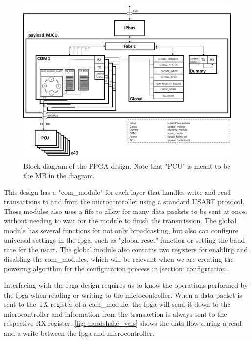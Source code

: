 \documentclass[main.tex]{subfiles}
\begin{document}
\begin{figure}[!htpb]
    \centering
    \includegraphics[width=13cm, scale=1]{images/BlockDiagramFPGA.png}
    \caption{Block diagram of the FPGA design. Note that "PCU" is meant to be the MB in the diagram.}
    \label{fig: fpga_block}
\end{figure}
\FloatBarrier

This design has a "com\_module" for each layer that handles write and read transactions to and from the microcontroller using a standard USART protocol. These modules also uses a \gls{fifo} to allow for many data packets to be sent at once, without needing to wait for the module to finish the transmission. The global module has several functions for not only broadcasting, but also can configure universal settings in the \gls{fpga}, such as "global reset" function or setting the baud rate for the \gls{usart}. The global module also contains two registers for enabling and disabling the com\_modules, which will be relevant when we are creating the powering algorithm for the configuration process in \autoref{section: configuration}.

Interfacing with the \gls{fpga} design requires us to know the operations performed by the \gls{fpga} when reading or writing to the microcontroller. When a data packet is sent to the TX register of a com\_module, the \gls{fpga} will send it down to the microcontroller and information from the transaction is always sent to the respective RX register. \autoref{fig: handshake_vals} shows the data flow during a read and a write between the \gls{fpga} and microcontroller.
\end{document}
